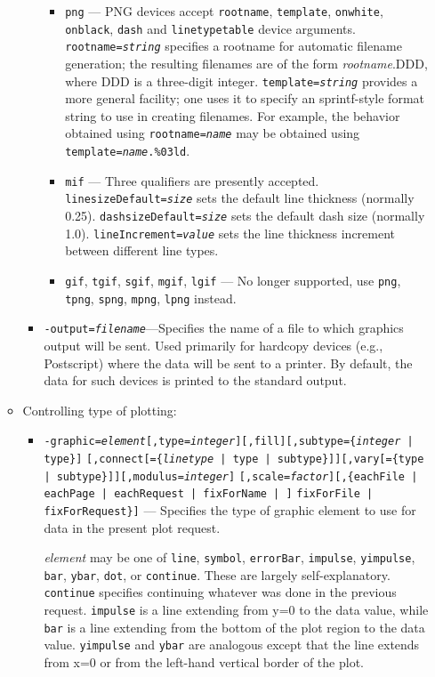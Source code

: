 \begin{itemize}
\begin{itemize}
\begin{itemize}
\begin{itemize}
        \item {\tt png} --- PNG devices accept {\tt rootname}, {\tt template}, {\tt onwhite}, {\tt onblack}, 
        {\tt dash} and {\tt linetypetable}  device arguments. {\tt rootname={\em string}} specifies a rootname
        for automatic filename generation; the resulting filenames are of the form {\em rootname}.DDD, where DDD 
        is a three-digit integer. {\tt template={\em string}} provides a more general facility; one uses it to
        specify an sprintf-style format string to use in creating filenames. For example, the behavior obtained
        using {\tt rootname={\em name}} may be obtained  using {\tt template={\em name}.\%03ld}.
        \item {\tt mif} --- Three qualifiers are presently accepted.  {\tt linesizeDefault={\em size}} sets the
        default line thickness (normally 0.25).  {\tt dashsizeDefault={\em size}} sets the default dash size
        (normally 1.0).  {\tt lineIncrement={\em value}} sets the line thickness increment between different
        line types.
        \item {\tt gif}, {\tt tgif}, {\tt sgif}, {\tt mgif}, {\tt lgif} --- No longer supported, use {\tt png}, 
        {\tt tpng}, {\tt spng}, {\tt mpng}, {\tt lpng} instead.
        \end{itemize}
  \item {\tt -output={\em filename}}---Specifies the name of a file to which graphics output will be sent.
        Used primarily for hardcopy devices (e.g., Postscript) where the data will be sent to a printer.
        By default, the data for such devices is printed to the standard output.
  \end{itemize}
\item Controlling type of plotting:
  \begin{itemize}

  \item {\tt -graphic={\em element}[,type={\em integer}][,fill][,subtype=\{{\em integer} | type\}]}
        {\tt [,connect[=\{{\em linetype} | type | subtype\}]][,vary[=\{type | subtype\}]][,modulus={\em integer}]}
        {\tt [,scale={\em factor}][,\{eachFile | eachPage | eachRequest | fixForName | ]}
	{\tt fixForFile | fixForRequest\}]} ---
        Specifies the type of graphic element to use for data in the present plot request.  

{\em element} may be one of {\tt line}, {\tt symbol}, {\tt errorBar}, {\tt impulse}, {\tt yimpulse}, {\tt
bar}, {\tt ybar}, {\tt dot}, or {\tt continue}.  These are largely self-explanatory.  {\tt continue}
specifies continuing whatever was done in the previous request.  {\tt impulse} is a line extending from
y=0 to the data value, while {\tt bar} is a line extending from the bottom of the plot region to the data
value.  {\tt yimpulse} and {\tt ybar} are analogous except that the line extends from x=0 or from the
left-hand vertical border of the plot.


\end{itemize}
\end{itemize}
\end{itemize}

